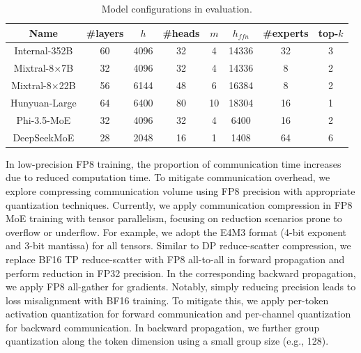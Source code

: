 \begin{table}[t!]
    \centering
    \resizebox{\linewidth}{!} {
        \begin{tabular}{@{}cccccccc@{}}
            \toprule
            Name & \#layers & $h$ & \#heads & $m$ & $h_{ffn}$ & \#experts & top-$k$ \\\midrule
            Internal-352B & 60 & 4096 & 32 & 4 & 14336 & 32 & 3 \\
            Mixtral-8$\times$7B & 32 & 4096 & 32 & 4 & 14336 & 8 & 2 \\
            Mixtral-8$\times$22B & 56 & 6144 & 48 & 6 & 16384 & 8 & 2 \\
            Hunyuan-Large & 64 & 6400 & 80 & 10 & 18304 & 16 & 1 \\
            Phi-3.5-MoE & 32 & 4096 & 32 & 4 & 6400 & 16 & 2 \\
            DeepSeekMoE & 28 & 2048 & 16 & 1 & 1408 & 64 & 6 \\
            \bottomrule
        \end{tabular}
    }
    \caption{Model configurations in evaluation.}
    \vspace{-0.2in}
    \label{tab:evaluation:model_conf}
\end{table}

 In low-precision FP8 training, the proportion of communication time increases due to reduced computation time. To mitigate communication overhead, we explore compressing communication volume using FP8 precision with appropriate quantization techniques. 
Currently, we apply communication compression in FP8 MoE training with tensor parallelism, focusing on reduction scenarios prone to overflow or underflow. For example, we adopt the E4M3 format (4-bit exponent and 3-bit mantissa) for all tensors. Similar to DP reduce-scatter compression, we replace BF16 TP reduce-scatter with FP8 all-to-all in forward propagation and perform reduction in FP32 precision. In the corresponding backward propagation, we apply FP8 all-gather for gradients. Notably, simply reducing precision leads to loss misalignment with BF16 training. To mitigate this, we apply per-token activation quantization for forward communication and per-channel quantization for backward communication. In backward propagation, we further group quantization along the token dimension using a small group size (e.g., 128).

